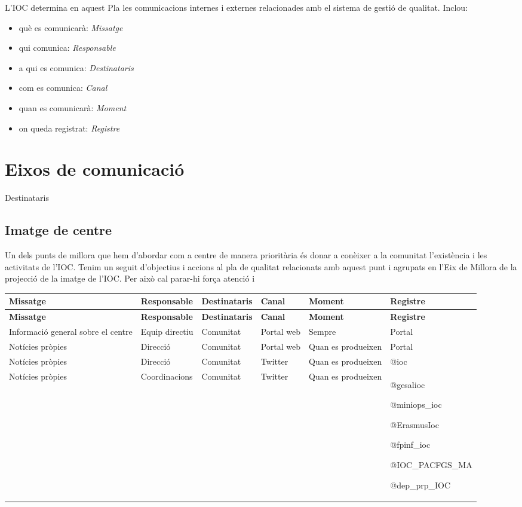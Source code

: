 \documentclass[fontsize=10pt,%
paper=a4,%
DIV=14,%
pagesize=auto,%
parskip=half,
captions=tableheading,%
numbers=noenddot,%
toc=graduated%
]{scrartcl}
\renewcommand{\arraystretch}{1.75}%
\renewcommand{\arraystretch}{1.75}%
\begin{document}
L'IOC determina en aquest Pla les comunicacions internes i externes relacionades amb el sistema de gestió de qualitat. Inclou:

\begin{itemize}
\item  què es comunicarà: \textit{Missatge}
\item  qui comunica: \textit{Responsable}
\item  a qui es comunica: \textit{Destinataris}
\item  com es comunica: \textit{Canal}
\item  quan es comunicarà: \textit{Moment}
\item  on queda registrat: \textit{Registre}
\end{itemize}

\section{Eixos de comunicació}\label{sec:eixos}

Destinataris

\subsection{Imatge de centre}

Un dels punts de millora que hem d'abordar com a centre de manera prioritària és 
donar a conèixer a la comunitat l'existència i les activitats de l'IOC. Tenim un seguit d'objectius i accions al pla de qualitat relacionats amb aquest punt i agrupats en l'Eix de Millora de la projecció de la imatge de l'IOC. Per això cal parar-hi força atenció i 

\small{
\setlength{\tabcolsep}{10pt}
\renewcommand{\arraystretch}{1.5}
\begin{longtable}{p{3cm}p{2cm}p{2cm}p{1.5cm}p{2cm}p{1.5cm}}
\hline
\textbf{Missatge}  & \textbf{Responsable} & \textbf{Destinataris} & \textbf{Canal} & \textbf{Moment} & \textbf{Registre}\\
\hline \endfirsthead
\hline
\textbf{Missatge}  & \textbf{Responsable} & \textbf{Destinataris} & \textbf{Canal} & \textbf{Moment} & \textbf{Registre}\\
\hline \endhead
Informació general sobre el centre & Equip directiu & Comunitat & Portal web & Sempre & Portal\\
Notícies pròpies & Direcció & Comunitat & Portal web & Quan es produeixen & Portal\\
Notícies pròpies & Direcció & Comunitat & Twitter & Quan es produeixen & @ioc\\
Notícies pròpies & Coordinacions & Comunitat & Twitter & Quan es produeixen & @gesalioc

@miniops\_ioc

@ErasmusIoc

@fpinf\_ioc

@IOC\_PACFGS\_MA

@dep\_prp\_IOC\\
\end{longtable}
}%
\end{document}
